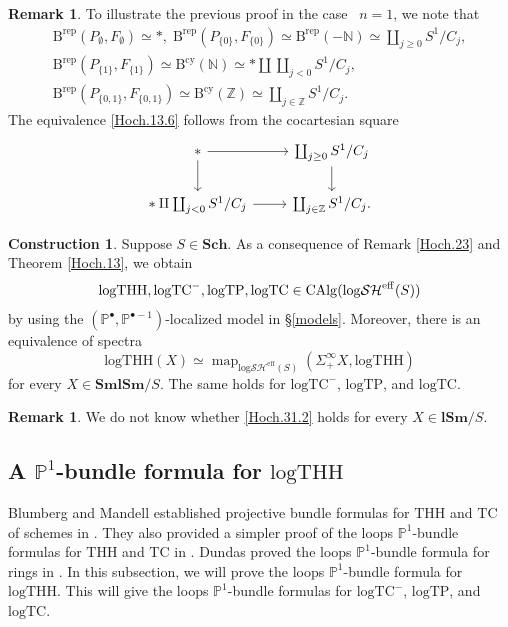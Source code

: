 \documentclass[11pt, a4paper]{amsart}
\theoremstyle{definition}
\newtheorem{const}[thm]{Construction}
\newtheorem{rmk}[thm]{Remark}
\numberwithin{equation}{subsection}
\newcommand{\N}{\mathbb{N}}
\newcommand{\Z}{\mathbb{Z}}
\renewcommand{\P}{\mathbb{P}}
\newcommand{\Sch}{\mathbf{Sch}}
\newcommand{\lSm}{\mathbf{lSm}}
\newcommand{\SmlSm}{\mathbf{SmlSm}}
\newcommand{\THH}{\mathrm{THH}}
\newcommand{\TC}{\mathrm{TC}}
\newcommand{\Brep}{\operatorname{B^{rep}}}
\newcommand{\Bcy}{\operatorname{B^{cy}}}
\newcommand{\logTHH}{\mathrm{logTHH}}
\newcommand{\logTC}{\mathrm{logTC}}
\newcommand{\logTP}{\mathrm{logTP}}
\newcommand{\eff}{{\rm eff}}
\newcommand{\CAlg}{\mathrm{CAlg}}
\newcommand{\inflogSH}{\mathrm{log}\mathcal{SH}}
\newcommand{\inflogSHS}{\mathrm{log}\mathcal{SH}^{\mathrm{eff}}}
\newcommand{\map}{\operatorname{map}}
\begin{document}
\begin{rmk}
To illustrate the previous proof in the case  $n=1$,  
we note that
\begin{gather*}
\Brep(P_\emptyset,F_\emptyset) \simeq *,
\;
\Brep(P_{\{0\}},F_{\{0\}})\simeq \Brep(-\N) \simeq \coprod_{j\geq 0}S^1/C_j,
\\
\Brep(P_{\{1\}},F_{\{1\}})\simeq \Bcy(\N)\simeq *\amalg \coprod_{j<0}S^1/C_j,
\\
\Brep(P_{\{0,1\}},F_{\{0,1\}}) \simeq \Bcy(\Z) \simeq \coprod_{j\in \Z} S^1/C_j.
\end{gather*}
The equivalence \eqref{Hoch.13.6} follows from the cocartesian square
\[
\begin{tikzcd}
*\ar[d]\ar[r]&
\coprod_{j\geq 0}S^1/C_j\ar[d]
\\
*\amalg \coprod_{j<0}S^1/C_j\ar[r]&
\coprod_{j\in \Z} S^1/C_j.
\end{tikzcd}
\]
\end{rmk}

\begin{const}
\label{Hoch.24}
Suppose $S\in \Sch$.
As a consequence of Remark \ref{Hoch.23} and Theorem \ref{Hoch.13}, we obtain
\begin{equation}
\label{Hoch.31.1}
\logTHH,\logTC^-,\logTP,\logTC
\in
\CAlg(\inflogSH^\eff(S))
\end{equation}
by using the $(\P^\bullet,\P^{\bullet-1})$-localized model in \S \ref{models}.
Moreover, there is an equivalence of spectra
\begin{equation}
\label{Hoch.31.2}
\logTHH(X)
\simeq
\map_{\inflogSHS(S)}(\Sigma_+^\infty X,\logTHH)
\end{equation}
for every $X\in \SmlSm/S$.
The same holds for $\logTC^-$, $\logTP$, and $\logTC$.
\end{const}

\begin{rmk}
We do not know whether \eqref{Hoch.31.2} holds for every $X\in \lSm/S$.
\end{rmk}




\subsection{A \texorpdfstring{$\P^1$}{P1}-bundle formula for \texorpdfstring{$\logTHH$}{logTHH}}\label{ssec:P1bundleTHH}

Blumberg and Mandell established projective bundle formulas for $\THH$ and $\TC$ of schemes in \cite[Theorem 1.5]{BM12}.
They also provided a simpler proof of the loops $\P^1$-bundle formulas for $\THH$ and $\TC$ in \cite[pp.\ 1102-1103]{BM12}.
Dundas proved the loops $\P^1$-bundle formula for rings in \cite[Proposition 3.3]{zbMATH01308186}.
In this subsection, we will prove the loops $\P^1$-bundle formula for $\logTHH$.
This will give the loops $\P^1$-bundle formulas for $\logTC^-$, $\logTP$, and $\logTC$.
\end{document}
